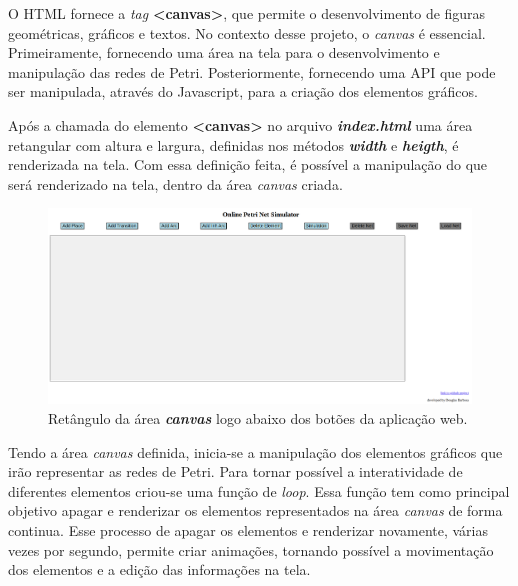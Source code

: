 \documentclass[
	12pt,				%
	openright,			%
	oneside,			%
	a4paper,			%
	english,			%
	brazil				%
	]{abntex2}
\begin{document}
O HTML fornece a \textit{tag} \textbf{<canvas>}, que permite o desenvolvimento de figuras geométricas, gráficos e textos. No contexto desse projeto, o \textit{canvas} é essencial. Primeiramente, fornecendo uma área na tela para o desenvolvimento e manipulação das redes de Petri. Posteriormente, fornecendo uma API que pode ser manipulada, através do Javascript, para a criação dos elementos gráficos. 



Após a chamada do elemento \textbf{<canvas>} no arquivo \textbf{\textit{index.html}} uma área retangular com altura e largura, definidas nos métodos \textbf{\textit{width}} e \textbf{\textit{heigth}}, é renderizada na tela. Com essa definição feita, é possível a manipulação do que será renderizado na tela, dentro da área \textit{canvas} criada. 

\begin{figure}[ht] 
	\centering
	\includegraphics[scale=0.3]{figuras/area_canvas.png}
	\caption[Área canvas]{Retângulo da área \textit{\textbf{canvas}} logo abaixo dos botões da aplicação web.}
	\label{fig:area_canvas}
\end{figure}
\FloatBarrier

Tendo a área \textit{canvas} definida, inicia-se a manipulação dos elementos gráficos que irão representar as redes de Petri. Para tornar possível a interatividade de diferentes elementos criou-se uma função de \textit{loop}. Essa função tem como principal objetivo apagar e renderizar os elementos representados na área \textit{canvas} de forma continua. Esse processo de apagar os elementos e renderizar novamente, várias vezes por segundo, permite criar animações, tornando possível a movimentação dos elementos e a edição das informações na tela. 


\end{document}
